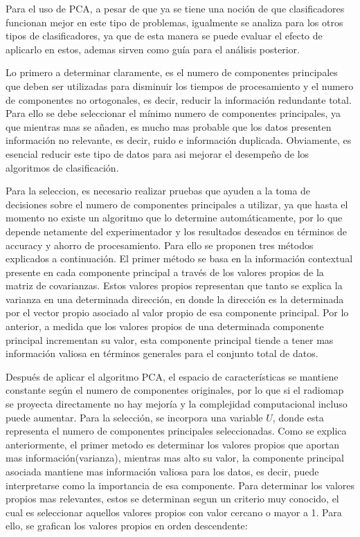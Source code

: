 Para el uso de PCA, a pesar de que ya se tiene una noción  de que clasificadores funcionan mejor en este tipo de problemas, igualmente se analiza para los otros tipos de clasificadores, ya que de esta manera se puede evaluar el efecto de aplicarlo en estos, ademas sirven como guía para el análisis posterior.

Lo primero a determinar claramente, es el numero de componentes principales que deben ser utilizadas para disminuir los tiempos de procesamiento y el numero de componentes no ortogonales, es decir, reducir la información redundante total. Para ello se debe seleccionar el mínimo numero de componentes principales, ya que mientras mas se añaden, es mucho mas probable que los datos presenten información no relevante, es decir, ruido e información duplicada. Obviamente, es esencial reducir este tipo de datos para asi mejorar el desempeño de los algoritmos de clasificación.

Para la seleccion, es necesario realizar pruebas que ayuden a la toma de decisiones sobre el numero de componentes principales a utilizar, ya que hasta el momento no existe un algoritmo que lo determine automáticamente, por lo que depende netamente del experimentador y los resultados deseados en términos de accuracy y ahorro de procesamiento. Para ello se proponen tres métodos explicados a continuación. El primer método se basa en la información contextual presente en cada componente principal a través de los valores propios de la matriz de covarianzas. Estos valores propios representan que tanto se explica la varianza en una determinada dirección, en donde la dirección es la determinada por el vector propio asociado al valor propio de esa componente principal. Por lo anterior, a medida que los valores propios de una determinada componente principal incrementan su valor, esta componente principal tiende a tener mas información valiosa en términos generales para el conjunto total de datos. 

Después de aplicar el algoritmo PCA, el espacio de características se mantiene constante según el numero de componentes originales, por lo que si el radiomap se proyecta directamente no hay mejoría y la complejidad computacional incluso puede aumentar. Para la selección, se incorpora una variable $U$, donde esta representa el numero de componentes principales seleccionadas. Como se explica anteriormente, el primer metodo es determinar los valores propios que aportan mas información(varianza), mientras mas alto su valor, la componente principal asociada mantiene mas información valiosa para los datos, es decir, puede interpretarse como la importancia de esa componente. Para determinar los valores propios mas relevantes, estos se determinan segun un criterio muy conocido, el cual es seleccionar aquellos valores propios con valor cercano o mayor a 1. Para ello, se grafican los valores propios en orden descendente:

